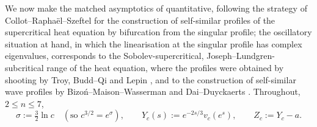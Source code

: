 \documentclass[11pt,a4paper]{amsart}
\theoremstyle{definition}
\theoremstyle{remark}
\begin{document}
We now make the matched asymptotics of \cite[\S2(a),(b)]{GHL22} quantitative, following the strategy of Collot--Rapha\"el--Szeftel \cite{CRS19} for the construction of self-similar profiles of the supercritical heat equation by bifurcation from the singular profile; the oscillatory situation at hand, in which the linearisation at the singular profile has complex eigenvalues, corresponds to the Sobolev-supercritical, Joseph--Lundgren-subcritical range of the heat equation, where the profiles were obtained by shooting by Troy, Budd--Qi and Lepin \cite{Tro87,BQ89,Lep90}, and to the construction of self-similar wave profiles by Bizo\'n--Maison--Wasserman \cite{BMW07} and Dai--Duyckaerts \cite{DD21}.  Throughout, $2\le n\le7$,
\[
\sigma:=\tfrac32\ln c\quad(\text{so } c^{3/2}=e^{\sigma}),\qquad Y_c(s):=e^{-2s/3}v_c(e^s),\qquad Z_c:=Y_c-a .
\]
\end{document}
